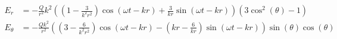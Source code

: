 \documentclass{article}
\begin{document}

\addtocounter{equation}{2}
\begin{align}
    E_r &= - \frac{Q}{r^{2}} k^{2} \left(\left(1 - \frac{3}{k^{2} r^{2}}\right) \cos{\left(\omega t - k r \right )} + \frac{3}{k r} \sin{\left (\omega t - k r \right )}\right) \left(3 \cos^{2}{\left (\theta \right )} - 1\right) \\
  E_\theta &= - \frac{Q k^{2}}{r^{2}} \left(\left(3 - \frac{6}{k^{2} r^{2}}\right) \cos{\left (\omega t - k r \right )} - \left(k r - \frac{6}{k r}\right) \sin{\left (\omega t - k r \right )}\right) \sin{\left (\theta \right )} \cos{\left (\theta \right )}
\end{align}
\end{document}

